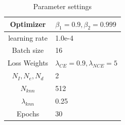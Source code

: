 
\renewcommand{\arraystretch}{1.3}
\begin{table}[t]
    \centering
    \caption{\small Parameter settings}
    \normalsize
    \begin{tabular}{|c|l|}
        \hline
        Optimizer & $\beta_1=0.9, \beta_2=0.999$ \\ \hline
        learning rate &  1.0e-4 \\ \hline
        Batch size & 16 \\ \hline
        Loss Weights & $\lambda_{CE}=0.9 , \lambda_{NCE}=5$ \\ \hline
        $N_I, N_e, N_d$ & 2 \\ \hline
        $N_{knn}$ & 512 \\ \hline
        $\lambda_{knn}$ & 0.25 \\ \hline
        Epochs &  30 \\ \hline
    \end{tabular}
    \label{tab:params}
\end{table}
\renewcommand{\arraystretch}{1.0}

